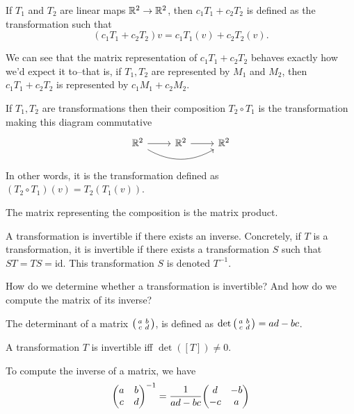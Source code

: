 \begin{definition}
    If $T_1$ and $T_2$ are linear maps $\mathbb R^2 \to \mathbb R^2$, then $c_1T_1 + c_2T_2$ is defined as the transformation such that \[(c_1T_1 + c_2T_2)v = c_1T_1(v) + c_2T_2(v).\]
\end{definition}

We can see that the matrix representation of $c_1T_1 + c_2T_2$ behaves exactly how we'd expect it to--that is, if $T_1, T_2$ are represented by $M_1$ and $M_2$, then $c_1T_1 + c_2T_2$ is represented by $c_1M_1 + c_2M_2$.

\begin{definition}[Composition]
    If $T_1, T_2$ are transformations then their composition $T_2 \circ T_1$ is the transformation making this diagram commutative \[ 
        \begin{tikzcd}
            \bb R^2 \arrow[r]{T_1} \arrow[rr, bend right = 30]& \bb R^2 \arrow[r] & \bb R^2
        \end{tikzcd}
    \]
    In other words, it is the transformation defined as $(T_2 \circ T_1)(v) = T_2(T_1(v))$.
\end{definition}

The matrix representing the composition is the matrix product.

\begin{definition}[Inverse]
    A transformation is invertible if there exists an inverse. Concretely, if $T$ is a transformation, it is invertible if there exists a transformation $S$ such that $ST = TS = \mathrm{id}$. This transformation $S$ is denoted $T^{-1}$.
\end{definition}

How do we determine whether a transformation is invertible? And how do we compute the matrix of its inverse?

\begin{definition}[Determinant]
    The determinant of a matrix $\smqty(a & b \\ c & d)$, is defined as $\det\smqty(a & b \\ c & d) = ad - bc$.
\end{definition}

\begin{proposition}
    A transformation $T$ is invertible iff $\det([T]) \ne 0$.
\end{proposition}

To compute the inverse of a matrix, we have \[\mqty(a & b \\ c & d)^{-1} = \frac{1}{ad - bc}\mqty(d & -b \\ -c & a)\]

